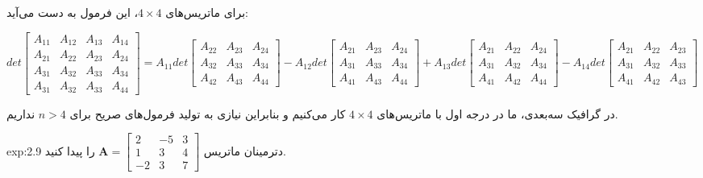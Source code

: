 {\begin{spacing}{1.3}
        برای ماتریس‌های $4\times 4$، این فرمول به دست می‌آید:

        \begin{flushleft}
            $det\begin{bmatrix}
                    A_{11} & A_{12} & A_{13} & A_{14} \\
                    A_{21} & A_{22} & A_{23} & A_{24} \\
                    A_{31} & A_{32} & A_{33} & A_{34} \\
                    A_{31} & A_{32} & A_{33} & A_{44}
            \end{bmatrix}=A_{11}det\begin{bmatrix}
                                       A_{22} & A_{23} & A_{24} \\
                                       A_{32} & A_{33} & A_{34} \\
                                       A_{42} & A_{43} & A_{44}
            \end{bmatrix}-A_{12}det\begin{bmatrix}
                                       A_{21} & A_{23} & A_{24} \\
                                       A_{31} & A_{33} & A_{34} \\
                                       A_{41} & A_{43} & A_{44}
            \end{bmatrix}+A_{13}det\begin{bmatrix}
                                       A_{21} & A_{22} & A_{24} \\
                                       A_{31} & A_{32} & A_{34} \\
                                       A_{41} & A_{42} & A_{44}
            \end{bmatrix}-A_{14}det\begin{bmatrix}
                                       A_{21} & A_{22} & A_{23} \\
                                       A_{31} & A_{32} & A_{33} \\
                                       A_{41} & A_{42} & A_{43}
            \end{bmatrix}$
        \end{flushleft}

        در گرافیک سه‌بعدی، ما در درجه اول با ماتریس‌های $4\times 4$ کار می‌کنیم و بنابراین نیازی به تولید فرمول‌های صریح برای $n>4$ نداریم.

        \begin{example}{exp:2.9}
            \Large
            دترمینان ماتریس $\textbf{A}=\begin{bmatrix}
                                            2  & -5 & 3 \\
                                            1  & 3  & 4 \\
                                            -2 & 3  & 7
            \end{bmatrix}$ را پیدا کنید.


\end{example}
\end{spacing}}
